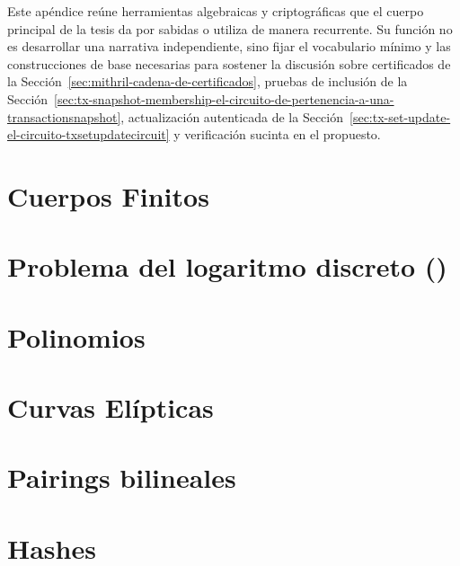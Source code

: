 \documentclass[11pt,a4paper,twoside]{tesis}
\begin{document}
Este apéndice reúne herramientas algebraicas y criptográficas que el cuerpo principal de la tesis da por sabidas o utiliza de manera recurrente. Su función no es desarrollar una narrativa independiente, sino fijar el vocabulario mínimo y las construcciones de base necesarias para sostener la discusión sobre certificados de la Sección~\ref{sec:mithril-cadena-de-certificados}, pruebas de inclusión de la Sección~\ref{sec:tx-snapshot-membership-el-circuito-de-pertenencia-a-una-transactionsnapshot}, actualización autenticada de la Sección~\ref{sec:tx-set-update-el-circuito-txsetupdatecircuit} y verificación sucinta en el \zkBridge propuesto.

\section{Cuerpos Finitos}
\label{sec:primitivas-criptograficas-cuerpos-finitos}



\section{Problema del logaritmo discreto (\DLP)}
\label{sec:primitivas-criptograficas-problema-del-logaritmo-discreto-dlp}



\section{Polinomios}
\label{sec:primitivas-criptograficas-polinomios}



\section{Curvas Elípticas}
\label{sec:primitivas-criptograficas-curvas-elipticas}



\section{Pairings bilineales}
\label{sec:primitivas-criptograficas-pairings-bilineales}



\section{Hashes}
\label{sec:primitivas-criptograficas-hashes}
\end{document}
